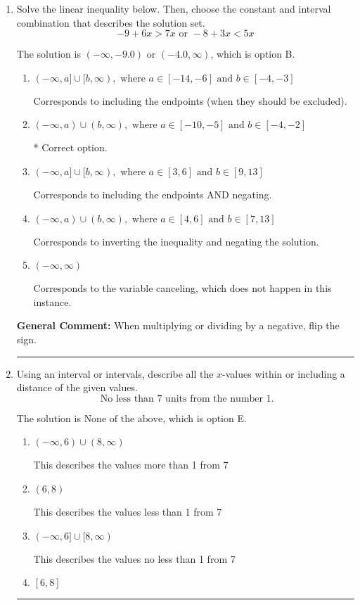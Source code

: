 \documentclass{extbook}[14pt]
\newcommand{\litem}[1]{\item #1

\rule{\textwidth}{0.4pt}}
\begin{document}
\begin{enumerate}\litem{
Solve the linear inequality below. Then, choose the constant and interval combination that describes the solution set.
\[ -9 + 6 x > 7 x \text{ or } -8 + 3 x < 5 x \]

The solution is \( (-\infty, -9.0) \text{ or } (-4.0, \infty) \), which is option B.\begin{enumerate}[label=\Alph*.]
\item \( (-\infty, a] \cup [b, \infty), \text{ where } a \in [-14, -6] \text{ and } b \in [-4, -3] \)

Corresponds to including the endpoints (when they should be excluded).
\item \( (-\infty, a) \cup (b, \infty), \text{ where } a \in [-10, -5] \text{ and } b \in [-4, -2] \)

 * Correct option.
\item \( (-\infty, a] \cup [b, \infty), \text{ where } a \in [3, 6] \text{ and } b \in [9, 13] \)

Corresponds to including the endpoints AND negating.
\item \( (-\infty, a) \cup (b, \infty), \text{ where } a \in [4, 6] \text{ and } b \in [7, 13] \)

Corresponds to inverting the inequality and negating the solution.
\item \( (-\infty, \infty) \)

Corresponds to the variable canceling, which does not happen in this instance.
\end{enumerate}

\textbf{General Comment:} When multiplying or dividing by a negative, flip the sign.
}
\litem{
Using an interval or intervals, describe all the $x$-values within or including a distance of the given values.
\[ \text{ No less than } 7 \text{ units from the number } 1. \]

The solution is \( \text{None of the above} \), which is option E.\begin{enumerate}[label=\Alph*.]
\item \( (-\infty, 6) \cup (8, \infty) \)

This describes the values more than 1 from 7
\item \( (6, 8) \)

This describes the values less than 1 from 7
\item \( (-\infty, 6] \cup [8, \infty) \)

This describes the values no less than 1 from 7
\item \( [6, 8] \)


\end{enumerate}}
\end{enumerate}
\end{document}
